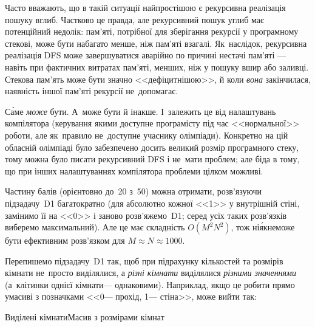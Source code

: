 \myhrulefill

Часто вважають, що в такій ситуації найпростішою є рекурсивна реалізація пошуку вглиб. Частково це правда, але рекурсивний пошук углиб має потенційний недолік: пам'яті, потрібної для зберігання рекурсії у програмному стекові, може бути набагато менше, ніж пам'яті взагалі. Як~наслідок, рекурсивна реалізація DFS може завершуватися аварійно по причині \mbox{нестачі} пам'яті --- навіть при фактичних витратах пам'яті, менших, ніж у пошуку вшир або заливці. Стекова пам'ять може бути значно <<дефіцитнішою>>, й коли \emph{вона} закінчилася, наявність іншої пам'яті рекурсії не~допомагає.

С\'{а}ме \emph{може} бути. А~може бути й інакше. І~залежить це від налаштувань компілятора (керування якими доступне програмісту під час <<нормальної>> роботи, але як~правило не~доступне учаснику олімпіади). Конкретно на цій обласній олімпіаді було забезпечено досить великий розмір програмного стеку, тому можна було писати рекурсивний DFS і не~мати проблем; але біда в тому, що при інших налаштуваннях компілятора проблеми цілком можливі.







Частину балів (орієнтовно до~20 з~50) можна отримати, розв’язуючи підзадачу~D1 багатократно (для абсолютно кожної <<1>> у внутрішній стіні, замінимо її на <<0>> і заново розв’яжемо~D1; серед усіх таких розв’язків виберемо максимальний). Але це має складність $O(M^2N^2)$, тож ні\'{я}к\nolinebreak[2] не\nolinebreak[3] може бути ефективним розв’язком для $M{\approx}N{\approx}1000$.

Перепишемо підзадачу~D1 так, щоб при підрахунку кількостей та розмірів кімнати не~просто виділялися, а \emph{різні кімнати} виділялися \emph{різними значеннями} (а~клітинки однієї кімнати\nolinebreak[3] --- однаковими). Наприклад, якщо це робити прямо у\nolinebreak[3] масиві з позначками <<0\nolinebreak[3] --- прохід, 1\nolinebreak[3] --- стіна>>, може вийти так:

\noindent\begin{minipage}{\textwidth}
\begin{exampleSimpleThreeWithSpecNameColTwo}{6em}{12em}{13em}{Виділені кімнати}{Масив з розмірами кімнат}%
%
\end{exampleSimpleThreeWithSpecNameColTwo}
\end{minipage}

